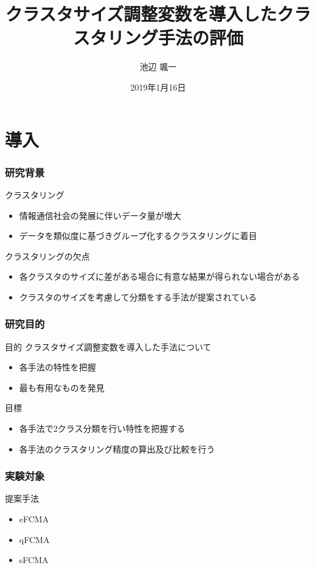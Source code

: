 \documentclass[13pt,dvipdfmx]{beamer}
\title[クラスタリング手法の評価]{クラスタサイズ調整変数を導入したクラスタリング手法の評価}
\author{池辺 颯一}
\institute[情報数理工学研究室]{情報数理工学研究室 \and af16009@shibaura-it.ac.jp}
\date{2019年1月16日}
\begin{document}
\begin{frame}\frametitle{}
  \titlepage
\end{frame}

\section{導入}
\begin{frame}\frametitle{研究背景}
 \begin{block}{クラスタリング}
  \begin{itemize}
   \item 情報通信社会の発展に伴いデータ量が増大
   \item データを類似度に基づきグループ化するクラスタリングに着目
  \end{itemize}
 \end{block}
 \begin{block}{クラスタリングの欠点}
  \begin{itemize}
   \item 各クラスタのサイズに差がある場合に有意な結果が得られない場合がある
   \item クラスタのサイズを考慮して分類をする手法が提案されている
  \end{itemize}
 \end{block}
\end{frame}

\begin{frame}\frametitle{研究目的}
  \begin{block}{目的}
   クラスタサイズ調整変数を導入した手法について
   \begin{itemize}
    \item 各手法の特性を把握
    \item 最も有用なものを発見
   \end{itemize}
  \end{block}
  \vspace{4mm}
  \begin{block}{目標}
    \begin{itemize}
    \item 各手法で2クラス分類を行い特性を把握する
    \item 各手法のクラスタリング精度の算出及び比較を行う
   \end{itemize}
  \end{block}
\end{frame}

\begin{frame}\frametitle{実験対象}
  \begin{block}{提案手法}
    \begin{itemize}
    \item eFCMA
    \item qFCMA
    \item sFCMA
    \end{itemize}
  \end{block}
\end{frame}
\end{document}
